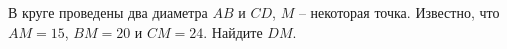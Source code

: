 \begin{ex}
	\begin{condition}
		В круге проведены два диаметра \( AB  \) и \( CD \), \( M \) – некоторая точка. Известно, что \( AM = 15 \), \( BM = 20  \) и \( CM = 24 \). Найдите \( DM \).
	\end{condition}
\end{ex}